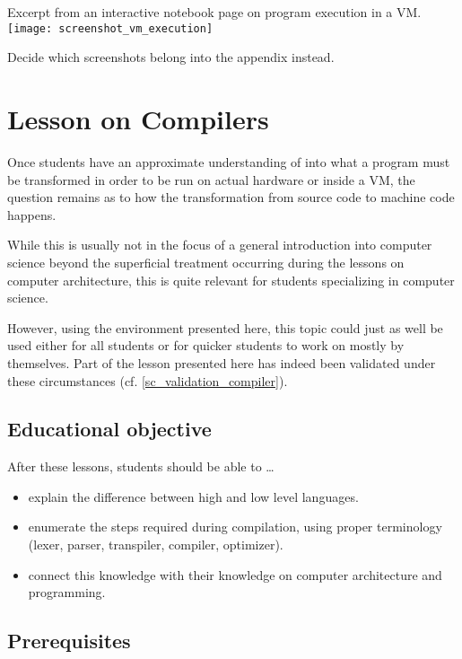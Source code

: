 \begin{cfigure}{Excerpt from an interactive notebook page on program execution in a VM.}
\texttt{[image: screenshot\_vm\_execution]}
\begin{todo}
\item Decide which screenshots belong into the appendix instead.
\end{todo}
\end{cfigure}



\section{Lesson on Compilers} \label{sc_lesson_compiler}

Once students have an approximate understanding of into what a program must be transformed in order to be run on actual hardware or inside a VM, the question remains as to how the transformation from source code to machine code happens.

While this is usually not in the focus of a general introduction into computer science beyond the superficial treatment occurring during the lessons on computer architecture, this is quite relevant for students specializing in computer science.

However, using the environment presented here, this topic could just as well be used either for all students or for quicker students to work on mostly by themselves. Part of the lesson presented here has indeed been validated under these circumstances (cf. \ref{sc_validation_compiler}).


\subsection{Educational objective}

After these lessons, students should be able to \dots
\begin{itemize}
\item explain the difference between high and low level languages.
\item enumerate the steps required during compilation, using proper terminology (lexer, parser, transpiler, compiler, optimizer).
\item connect this knowledge with their knowledge on computer architecture and programming.
\end{itemize}


\subsection{Prerequisites}

